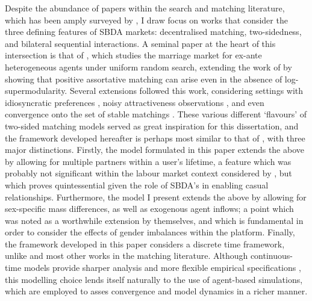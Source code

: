 Despite the abundance of papers within the search and matching literature, which has been amply surveyed by \cite{chade2017sorting}, I draw focus on works that consider the three defining features of SBDA markets: decentralised matching, two-sidedness, and bilateral sequential interactions. A seminal paper at the heart of this intersection is that of \cite{burdett1997marriage}, which studies the marriage market for ex-ante heterogeneous agents under uniform random search, extending the work of \cite{becker1973theory} by showing that positive assortative matching can arise even in the absence of log-supermodularity.
Several extensions followed this work, considering settings with idiosyncratic preferences \citep{burdett1998two}, noisy attractiveness observations \citep{chade2006matching}, and even convergence onto the set of stable matchings \citep{adachi2003search}. These various different `flavours' of two-sided matching models served as great inspiration for this dissertation, and the framework developed hereafter is perhaps most similar to that of \cite{burdett1998two}, with three major distinctions. 
Firstly, the model formulated in this paper extends the above by allowing for multiple partners within a user's lifetime, a feature which was probably not significant within the labour market context considered by \cite{burdett1998two}, but which proves quintessential given the role of SBDA's in enabling casual relationships.
Furthermore, the model I present extends the above by allowing for sex-specific mass differences, as well as exogenous agent inflows; a point which was noted as a worthwhile extension by \citeauthor{burdett1998two} themselves, and which is fundamental in order to consider the effects of gender imbalances within the platform. 
Finally, the framework developed in this paper considers a discrete time framework, unlike \cite{burdett1998two} and most other works in the matching literature. Although continuous-time models provide sharper analysis and more flexible empirical specifications \citep{burdett1999long}, this modelling choice lends itself naturally to the use of agent-based simulations, which are employed to asses convergence and model dynamics in a richer manner. 

